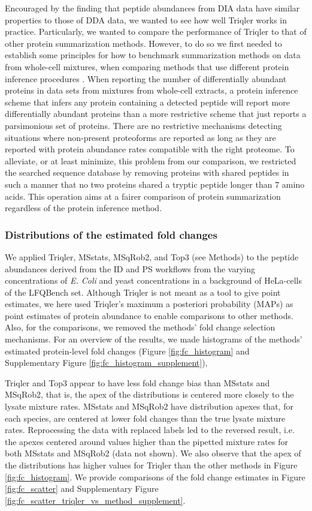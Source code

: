 \documentclass[10pt,letterpaper]{article}
\begin{document}
Encouraged by the finding that peptide abundances from DIA data have similar properties to those of DDA data, we wanted to see how well Triqler works in practice. Particularly, we wanted to compare the performance of Triqler to that of other protein summarization methods. However, to do so we first needed to establish some principles for how to benchmark summarization methods on data from whole-cell mixtures, when comparing methods that use different protein inference procedures \cite{serang2012recognizing}. When reporting the number of differentially abundant proteins in data sets from mixtures from whole-cell extracts, a protein inference scheme that infers any protein containing a detected peptide will report more differentially abundant proteins than a more restrictive scheme that just reports a parsimonious set of proteins. There are no restrictive mechanisms detecting situations where non-present proteoforms are reported as long as they are reported with protein abundance rates compatible with the right proteome. To alleviate, or at least minimize, this problem from our comparison, we restricted the searched sequence database by removing proteins with shared peptides in such a manner that no two proteins shared a tryptic peptide longer than 7 amino acids. This operation aims at a fairer comparison of protein summarization regardless of the protein inference method. 

\subsubsection*{Distributions of the estimated fold changes}

We applied Triqler, MSstats, MSqRob2, and Top3 (see Methods) to the peptide abundances derived from the ID and PS workflows from the varying concentrations of {\em E. Coli} and yeast concentrations in a background of HeLa-cells of the LFQBench set. Although Triqler is not meant as a tool to give point estimates, we here used Triqler's maximum a posteriori probability (MAPs) as point estimates of protein abundance to enable comparisons to other methods. Also, for the comparisons, we removed the methods' fold change selection mechanisms. For an overview of the results, we made histograms of the methods' estimated protein-level fold changes (Figure \ref{fig:fc_histogram} and Supplementary Figure \ref{fig:fc_histogram_supplement}), 

Triqler and Top3 appear to have less fold change bias than MSstats and MSqRob2, that is, the apex of the distributions is centered more closely to the lysate mixture rates. MSstats and MSqRob2 have distribution apexes that, for each species, are centered at lower fold changes than the true lysate mixture rates. Reprocessing the data with replaced labels led to the reversed result, i.e. the apexes centered around values higher than the pipetted mixture rates for both MSstats and MSqRob2 (data not shown). We also observe that the apex of the distributions has higher values for Triqler than the other methods in Figure \ref{fig:fc_histogram}. We provide comparisons of the fold change estimates in Figure \ref{fig:fc_scatter} and Supplementary Figure \ref{fig:fc_scatter_triqler_vs_method_supplement}.
\end{document}

